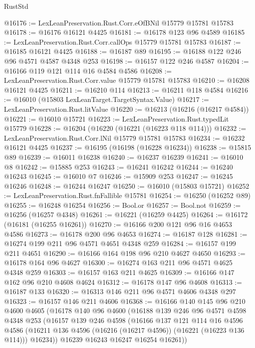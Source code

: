 \begin{lexlean}{RustStd}
\begin{coremodule}
@16176 := LexLeanPreservation.Rust.Corr.eOfBNil @15779 @15781 @15783
@16178 := @16176 @16121 @4425
@16181 := @16178 @123 @96 @4589
@16185 := LexLeanPreservation.Rust.Corr.callOps @15779 @15781 @15783
@16187 := @16185 @16121 @4425
@16188 := @16187 @89
@16195 := @16188 @122 @246 @96 @4571 @4587 @4348 @253
@16198 := @16157 @122 @246 @4587
@16204 := @16166 @119 @121 @114 @16 @4584 @4586
@16208 := LexLeanPreservation.Rust.Corr.value @15779 @15781 @15783
@16210 := @16208 @16121 @4425
@16211 := @16210 @114
@16213 := @16211 @118 @4584
@16216 := @16010 (@15803 LexLeanTarget.TargetSyntax.Value)
@16217 := LexLeanPreservation.Rust.litValue
@16220 := @16213 (@16216 (@16217 @4584))
@16221 := @16010 @15721
@16223 := LexLeanPreservation.Rust.typedLit @15779
@16228 := @16204 (@16220 (@16221 (@16223 @118 @114)))
@16232 := LexLeanPreservation.Rust.Corr.lNil @15779 @15781 @15783
@16234 := @16232 @16121 @4425
@16237 := @16195 (@16198 (@16228 @16234))
@16238 := @15815 @89
@16239 := @16011 @16238
@16240 := @16237 @16239
@16241 := @16010 @8
@16242 := @15885 @253
@16243 := @16241 @16242
@16244 := @16240 @16243
@16245 := @16010 @7
@16246 := @15909 @253
@16247 := @16245 @16246
@16248 := @16244 @16247
@16250 := @16010 (@15803 @15721)
@16252 := LexLeanPreservation.Rust.fnFallible @15781
@16254 := @16250 (@16252 @89)
@16255 := @16248 @16254
@16256 := Bool.or
@16257 := Bool.not
@16259 := @16256 (@16257 @4348)
@16261 := @16221 (@16259 @4425)
@16264 := @16172 (@16181 (@16255 @16261))
@16270 := @16166 @200 @121 @96 @16 @4653 @4586
@16273 := @16178 @200 @96 @4653
@16274 := @16187 @128
@16281 := @16274 @199 @211 @96 @4571 @4651 @4348 @259
@16284 := @16157 @199 @211 @4651
@16290 := @16166 @164 @198 @96 @210 @4627 @4650
@16293 := @16178 @164 @96 @4627
@16300 := @16274 @163 @211 @96 @4571 @4625 @4348 @259
@16303 := @16157 @163 @211 @4625
@16309 := @16166 @147 @162 @96 @210 @4608 @4624
@16312 := @16178 @147 @96 @4608
@16313 := @16187 @133
@16320 := @16313 @146 @211 @96 @4571 @4606 @4348 @297
@16323 := @16157 @146 @211 @4606
@16368 := @16166
    @140
    @145
    @96
    @210
    @4600
    @4605
    (@16178
      @140
      @96
      @4600
      (@16188
        @139
        @246
        @96
        @4571
        @4598
        @4348
        @253
        (@16157
          @139
          @246
          @4598
          (@16166
            @137
            @121
            @114
            @16
            @4596
            @4586
            (@16211 @136 @4596 (@16216 (@16217 @4596)) (@16221 (@16223 @136 @114)))
            @16234))
        @16239
        @16243
        @16247
        @16254
        @16261))

\end{coremodule}
\end{lexlean}
